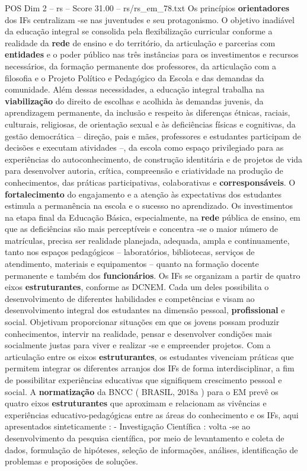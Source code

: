 \begin{textsample}{POS Dim 2 – rs – Score 31.00 – rs/rs\_em\_78.txt}
Os princípios \textbf{orientadores} dos IFs centralizam -se nas juventudes e seu protagonismo.
O objetivo inadiável da educação integral se consolida pela flexibilização curricular conforme a realidade da \textbf{rede} de ensino e do território, da articulação e parcerias com \textbf{entidades} e o poder público nas três instâncias para os investimentos e recursos necessários, da formação permanente dos professores, da articulação com a filosofia e o Projeto Político e Pedagógico da Escola e das demandas da comunidade.
Além dessas necessidades, a educação integral trabalha na \textbf{viabilização} do direito de escolhas e acolhida às demandas juvenis, da aprendizagem permanente, da inclusão e respeito às diferenças étnicas, raciais, culturais, religiosas, de orientação sexual e às deficiências físicas e cognitivas, da gestão democrática – direção, pais e mães, professores e estudantes participam de decisões e executam atividades –, da escola como espaço privilegiado para as experiências do autoconhecimento, de construção identitária e de projetos de vida para desenvolver autoria, crítica, compreensão e criatividade na produção de conhecimentos, das práticas participativas, colaborativas e \textbf{corresponsáveis}.
O \textbf{fortalecimento} do engajamento e a atenção às expectativas dos estudantes estimula a permanência na escola e o sucesso no aprendizado.
Os investimentos na etapa final da Educação Básica, especialmente, na \textbf{rede} pública de ensino, em que as deficiências são mais perceptíveis e concentra -se o maior número de matrículas, precisa ser realidade planejada, adequada, ampla e continuamente, tanto nos espaços pedagógicos – laboratórios, bibliotecas, serviços de atendimento, materiais e equipamentos – quanto na formação docente permanente e também dos \textbf{funcionários}.
Os IFs se organizam a partir de quatro eixos \textbf{estruturantes}, conforme as DCNEM.
Cada um deles possibilita o desenvolvimento de diferentes habilidades e competências e visam ao desenvolvimento integral dos estudantes na dimensão pessoal, \textbf{profissional} e social.
Objetivam proporcionar situações em que os jovens possam produzir conhecimentos, intervir na realidade, pensar e desenvolver condições mais socialmente justas para viver e realizar -se e empreender projetos.
Com a articulação entre os eixos \textbf{estruturantes}, os estudantes vivenciam práticas que permitem integrar os diferentes arranjos dos IFs de forma interdisciplinar, a fim de possibilitar experiências educativas que signifiquem crescimento pessoal e social.
A \textbf{normatização} da BNCC ( BRASIL, 2018a ) para o EM prevê os quatro eixos \textbf{estruturantes} que aproximam e relacionam as vivências e experiências educativo-pedagógicas entre as áreas do conhecimento e os IFs, aqui apresentados sinteticamente : - Investigação Científica : volta -se ao desenvolvimento da pesquisa científica, por meio de levantamento e coleta de dados, formulação de hipóteses, seleção de informações, análises, identificação de problemas e proposições de soluções.

\end{textsample}

